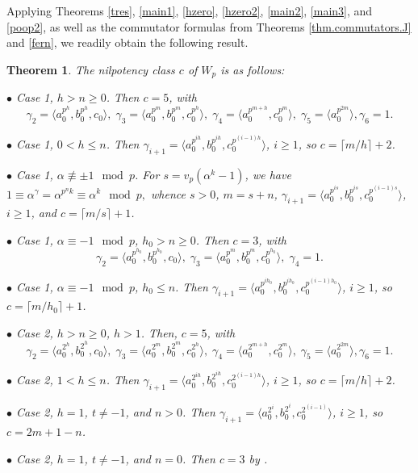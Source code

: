 \documentclass{amsart}
\newtheorem{theorem}{Theorem}[section]
\theoremstyle{definition}
\theoremstyle{remark}
\begin{document}
{Applying Theorems \ref{tres}, \ref{main1}, \ref{hzero}, \ref{hzero2}, \ref{main2}, \ref{main3}, and \ref{poop2},
as well as the commutator formulas from Theorems \ref{thm.commutators.J} and \ref{fern}, we readily
obtain the following result.

\begin{theorem}\label{nilp} The nilpotency class $c$ of $W_p$ is as follows:

$\bullet$ Case 1, $h>n\geq 0$. Then $c=5$, with
$$\gamma_{2}=\langle a_0^{p^{h}}, b_0^{p^{h}}, c_0\rangle,\; 
\gamma_{3}=\langle a_0^{p^{m}}, b_0^{p^{m}}, c_0^{p^{h}}\rangle,\;
\gamma_{4}=\langle a_0^{p^{m+h}},c_0^{p^{m}}\rangle,\;
\gamma_{5}=\langle a_0^{p^{2m}}\rangle, \gamma_{6}=1.
$$


$\bullet$ Case 1, $0<h\leq n$. Then $\gamma_{i+1}=\langle a_0^{p^{i h}}, b_0^{p^{i h}}, c_0^{p^{(i-1)h}}\rangle$, $i\geq 1$,
so $c=\lceil m/h\rceil+2$.



$\bullet$ Case 1, $\alpha\not\equiv \pm 1\mod p$. For $s=v_p(\alpha^k-1)$, we have
$
1\equiv \alpha^\gamma=\alpha^{p^n k}\equiv \alpha^k\mod p,
$
whence $s>0$, $m=s+n$, $\gamma_{i+1}=\langle a_0^{p^{i s}}, b_0^{p^{i s}}, c_0^{p^{(i-1)s}}\rangle$, $i\geq 1$,
and $c=\lceil m/s\rceil+1$.

$\bullet$ Case 1, $\alpha\equiv -1\mod p$, $h_0>n\geq 0$. Then $c=3$, with
$$\gamma_{2}=\langle a_0^{p^{h_0}}, b_0^{p^{h_0}}, c_0\rangle,\; 
\gamma_{3}=\langle a_0^{p^{m}}, b_0^{p^{m}}, c_0^{p^{h_0}}\rangle,\;
\gamma_{4}=1.
$$


$\bullet$ Case 1, $\alpha\equiv -1\mod p$, $h_0\leq n$. Then 
$\gamma_{i+1}=\langle a_0^{p^{i h_0}}, b_0^{p^{i h_0}}, c_0^{p^{(i-1)h_0}}\rangle$, $i\geq 1$,
so $c=\lceil m/h_0\rceil+1$.

$\bullet$ Case 2, $h>n\geq 0$, $h>1$. Then, $c=5$, with
$$\gamma_{2}=\langle a_0^{2^{h}}, b_0^{2^{h}}, c_0\rangle,\; 
\gamma_{3}=\langle a_0^{2^{m}}, b_0^{2^{m}}, c_0^{2^{h}}\rangle,\;
\gamma_{4}=\langle a_0^{2^{m+h}},c_0^{2^{m}}\rangle,\;
\gamma_{5}=\langle a_0^{2^{2m}}\rangle, \gamma_{6}=1.
$$


$\bullet$ Case 2, $1<h\leq n$. Then $\gamma_{i+1}=\langle a_0^{2^{i h}}, b_0^{2^{i h}}, c_0^{2^{(i-1)h}}\rangle$, $i\geq 1$,
so $c=\lceil m/h\rceil+2$.

$\bullet$ Case 2, $h=1$, $t\neq -1$, and $n>0$. Then $\gamma_{i+1}=\langle a_0^{2^{i}}, b_0^{2^{i}}, c_0^{2^{(i-1) }}\rangle$, $i\geq 1$,
so $c=2m+1-n$.

$\bullet$ Case 2, $h=1$, $t\neq -1$, and $n=0$. Then $c=3$ by \cite[Proposition 8.2]{MS}.


\end{theorem}}
\end{document}
